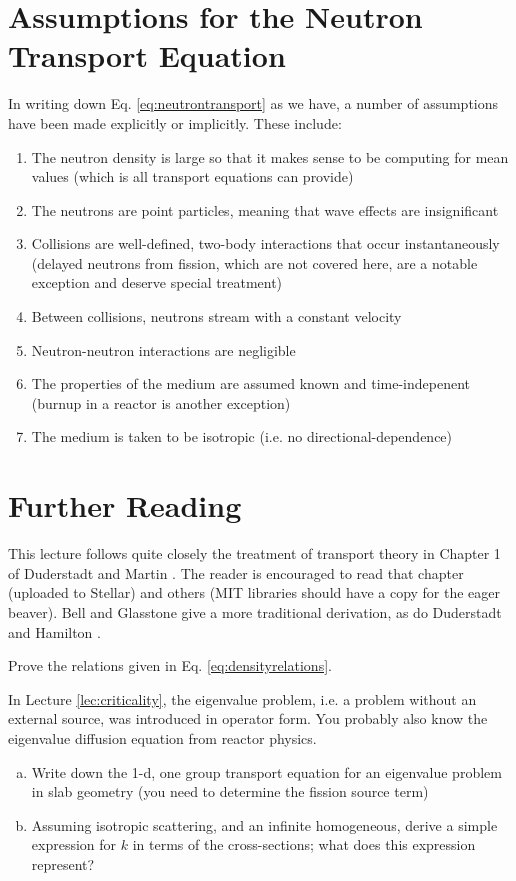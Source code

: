 \section*{Assumptions for the Neutron Transport Equation}
In writing down Eq. \ref{eq:neutrontransport} as we have, a number of assumptions have been made explicitly or implicitly.  These include:
\begin{enumerate}
   \item The neutron density is large so that it makes sense to be computing for mean values (which is all transport equations can provide)
   \item The neutrons are point particles, meaning that wave effects are insignificant
   \item Collisions are well-defined, two-body interactions that occur instantaneously (delayed neutrons from fission, which are not covered here, are a notable exception and deserve special treatment)
   \item Between collisions, neutrons stream with a constant velocity
   \item Neutron-neutron interactions are negligible
   \item The properties of the medium are assumed known and time-indepenent (burnup in a reactor is another exception)
   \item The medium is taken to be isotropic (i.e. no directional-dependence)
\end{enumerate}


\section*{Further Reading}
This lecture follows quite closely the treatment of transport theory in Chapter 1 of Duderstadt and Martin \cite{duderstadt1976tt}.  The reader is encouraged to read that chapter (uploaded to Stellar) and others (MIT libraries should have a copy for the eager beaver).  Bell and Glasstone \cite{bell1970nrt} give a more traditional derivation, as do Duderstadt and Hamilton \cite{duderstadt1976nra}.
 
\begin{exercises}
 
  \item Prove the relations given in Eq. \ref{eq:densityrelations}.

  \item In Lecture \ref{lec:criticality}, the eigenvalue problem, i.e. a problem without an external source, was introduced in operator form.  You probably also know the eigenvalue diffusion equation from reactor physics. 
  \begin{enumerate}[(a)]
   \item Write down the 1-d, one group transport equation for an eigenvalue problem in slab geometry (you need to determine the fission source term)
   \item Assuming isotropic scattering, and an infinite homogeneous, derive a simple expression for $k$ in terms of the cross-sections; what does this expression represent?
  \end{enumerate}


\end{exercises}
